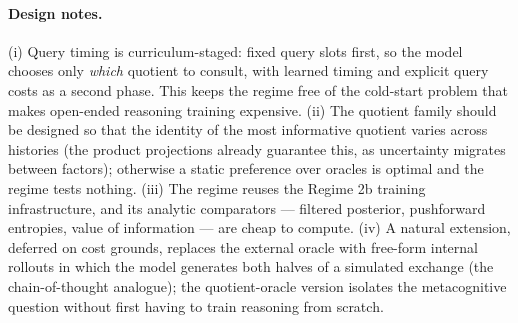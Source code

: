 \paragraph{Design notes.} (i) Query timing is curriculum-staged: fixed query
slots first, so the model chooses only \emph{which} quotient to consult, with
learned timing and explicit query costs as a second phase. This keeps the
regime free of the cold-start problem that makes open-ended reasoning training
expensive. (ii) The quotient family should be designed so that the identity of
the most informative quotient varies across histories (the product projections
already guarantee this, as uncertainty migrates between factors); otherwise a
static preference over oracles is optimal and the regime tests nothing.
(iii) The regime reuses the Regime 2b training infrastructure, and its analytic
comparators --- filtered posterior, pushforward entropies, value of information
--- are cheap to compute. (iv) A natural extension, deferred on cost grounds,
replaces the external oracle with free-form internal rollouts in which the
model generates both halves of a simulated exchange (the chain-of-thought
analogue); the quotient-oracle version isolates the metacognitive question
without first having to train reasoning from scratch.
